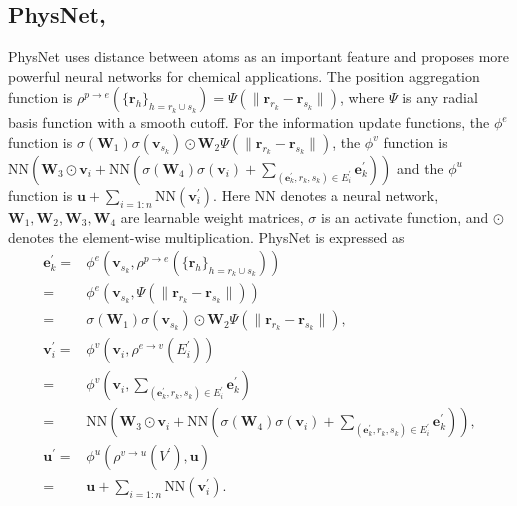 \documentclass{article}
\begin{document}
\subsection[PhysNet,]{PhysNet, ~\cite{unke2019physnet}}
PhysNet uses distance between atoms as an important feature and proposes more powerful neural networks for chemical applications. The position aggregation function is $\rho^{p\rightarrow e}\left(\{\mathbf{r}_h\}_{h=r_k \cup s_k}\right)=\Psi\left(\|\mathbf{r}_{r_k}-\mathbf{r}_{s_k} \|\right)$, where $\Psi$ is any radial basis function with a smooth cutoff. For the information update functions, the $\phi^e$ function is $\sigma \left(\mathbf{W}_1\right) \sigma \left(\mathbf{v}_{s_k}\right)\odot \mathbf{W}_2 \Psi\left(\|\mathbf{r}_{r_k}-\mathbf{r}_{s_k} \|\right)$, the $\phi^v$ function is $\text{NN}\left(\mathbf{W}_3 \odot \mathbf{v}_{i}+\text{NN}\left( \sigma \left(\mathbf{W}_4\right) \sigma \left(\mathbf{v}_i\right)+\sum_{\left(\mathbf{e}^\prime_k, r_k, s_k\right)\in E_{i}^\prime}\mathbf{e}^\prime_k\right)\right)$ and the $\phi^u$ function is $\mathbf{u} + \sum_{i=1:n}\text{NN}\left(\mathbf{v}^\prime_i\right)$. Here $\text{NN}$ denotes a neural network, $\mathbf{W}_1, \mathbf{W}_2, \mathbf{W}_3, \mathbf{W}_4$ are learnable weight matrices, $\sigma$ is an activate function, and $\odot$ denotes the element-wise multiplication. PhysNet is expressed as
\begin{equation}\label{eq:phynet}
\begin{aligned}
\mathbf{e}^\prime_k 
=& \phi^e\left( \mathbf{v}_{s_k}, \rho^{p\rightarrow e}\left(\{\mathbf{r}_h\}_{h=r_k \cup s_k}\right)\right)\\
=& \phi^e\left( \mathbf{v}_{s_k}, \Psi\left(\|\mathbf{r}_{r_k}-\mathbf{r}_{s_k} \|\right)\right)\\
=&\sigma\left( \mathbf{W}_1\right)\sigma\left(\mathbf{v}_{s_k}\right)\odot \mathbf{W}_2 \Psi\left(\|\mathbf{r}_{r_k}-\mathbf{r}_{s_k} \|\right),\\
\mathbf{v}^\prime_i 
=&\phi^v\left(\mathbf{v}_i, \rho^{e\rightarrow v}\left(E_{i}^\prime\right)\right)\\
=&\phi^v\left(\mathbf{v}_i, \sum_{\left(\mathbf{e}^\prime_k, r_k, s_k\right)\in E_{i}^\prime}\mathbf{e}^\prime_k\right)\\
=&\text{NN}\left(\mathbf{W}_3 \odot \mathbf{v}_{i}+\text{NN}\left( \sigma \left(\mathbf{W}_4\right) \sigma \left(\mathbf{v}_i\right)+\sum_{\left(\mathbf{e}^\prime_k, r_k, s_k\right)\in E_{i}^\prime}\mathbf{e}^\prime_k\right)\right),\\
\mathbf{u}^\prime 
=&  \phi^u\left(\rho^{v\rightarrow u}\left(V^\prime\right), \mathbf{u}\right)\\
=& \mathbf{u} + \sum_{i=1:n}\text{NN}\left(\mathbf{v}^\prime_i\right).
\end{aligned}
\end{equation}
\end{document}

